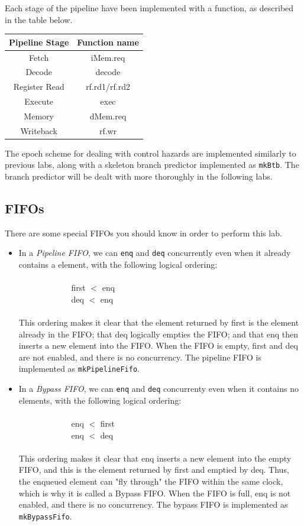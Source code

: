 \documentclass{article}
\begin{document}
Each stage of the pipeline have been implemented with a function, as
described in the table below.

\begin{table}[h]
\centering
\begin{tabular}{|c|c|}
\hline
Pipeline Stage & Function name \\
\hline
Fetch & iMem.req \\
Decode & decode \\
Register Read & rf.rd1/rf.rd2 \\
Execute & exec \\
Memory & dMem.req \\
Writeback & rf.wr \\
\hline
\end{tabular}
\end{table}

The epoch scheme for dealing with control hazards are implemented
similarly to previous labs, along with a skeleton branch predictor
implemented as \texttt{mkBtb}. The branch predictor will be dealt with
more thoroughly in the following labs.

\subsection{FIFOs}

There are some special FIFOs you should know in order to perform this lab. 

\begin{itemize}
\item In a \textit{Pipeline FIFO}, we can \texttt{enq} and \texttt{deq} concurrently even
when it already contains a element, with the following logical ordering:
\\\\$\phantom{123123123123}$ first $<$ enq
\\$\phantom{123123123123}$ deq $<$ enq\\\\
This ordering makes it clear that the element returned by first is the element already
in the FIFO; that deq logically empties the FIFO; and that enq then inserts a new
element into the FIFO. When the FIFO is empty, first and deq are not enabled, and
there is no concurrency. The pipeline FIFO is implemented as \texttt{mkPipelineFifo}.

\item In a \textit{Bypass FIFO}, we can \texttt{enq} and \texttt{deq} concurrenty even when it contains no elements,
with the following logical ordering:
\\\\$\phantom{123123123123}$ enq $<$ first
\\$\phantom{123123123123}$ enq $<$ deq\\\\
This ordering makes it clear that enq inserts a new element into the empty FIFO,
and this is the element returned by first and emptied by deq. Thus, the enqueued
element can "fly through" the FIFO within the same clock, which is why it is called a
Bypass FIFO. When the FIFO is full, enq is not enabled, and there is no concurrency.
The bypass FIFO is implemented as \texttt{mkBypassFifo}.
\end{itemize}
\end{document}
